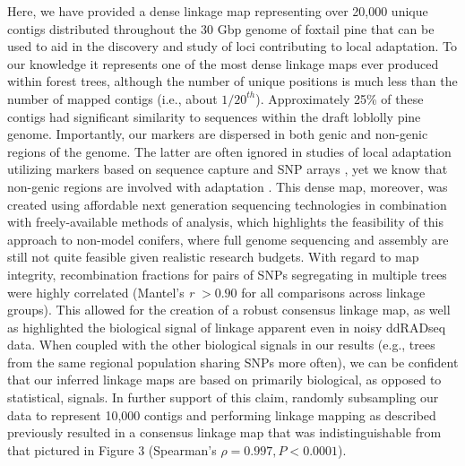 \documentclass[smallextended]{svjour3}
\begin{document}
Here, we have provided a dense linkage map representing over 20,000 unique
contigs distributed throughout the 30 Gbp genome of foxtail pine that can be
used to aid in the discovery and study of loci contributing to local
adaptation. To our knowledge it represents one of the most dense linkage maps
ever produced within forest trees, although the number of unique positions is
much less than the number of mapped contigs (i.e., about
$1/20^{th}$). Approximately 25\% of these contigs had significant similarity to
sequences within the draft loblolly pine genome. Importantly, our markers are
dispersed in both genic and non-genic regions of the genome. The latter are
often ignored in studies of local adaptation utilizing markers based on sequence
capture \citep[e.g.,][]{Neves:2014} and SNP arrays
\citep[e.g.,][]{Eckert:2010a}, yet we know that non-genic regions are involved with adaptation \citep{Studer:2011}.
This dense map, moreover, was created using
affordable next generation sequencing technologies in combination with freely-available
methods of analysis, which highlights the feasibility of this approach to
non-model conifers, where full genome sequencing and assembly are still not quite
feasible given realistic research budgets.  With regard to map integrity,
recombination fractions for pairs of SNPs segregating in multiple trees were
highly correlated (Mantel's \textit{r} $> 0.90$ for all comparisons across
linkage groups).  This allowed for the creation of a robust consensus linkage
map, as well as highlighted the biological signal of linkage apparent even in
noisy ddRADseq data. When coupled with the other biological signals in our
results (e.g., trees from the same regional population sharing SNPs more often),
we can be confident that our inferred linkage maps are based on primarily
biological, as opposed to statistical, signals. In further support of this
claim, randomly subsampling our data to represent 10,000 contigs and performing
linkage mapping as described previously resulted in a consensus linkage map that
was indistinguishable from that pictured in Figure $3$ (Spearman's $\rho =
0.997, P < 0.0001$).
\end{document}
